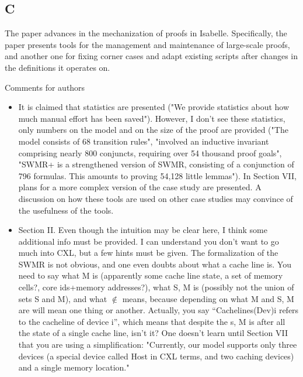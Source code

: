 \documentclass[10pt,conference]{IEEEtran}
\begin{document}
\subsection{C}
The paper advances in the mechanization of proofs in Isabelle. Specifically, the paper presents tools for the management and maintenance of large-scale proofs, and another one for fixing corner cases and adapt existing scripts after changes in the definitions it operates on.

Comments for authors
\begin{itemize}
    \item It is claimed that statistics are presented ("We provide statistics about how much manual effort has been saved"). However, I don't see these statistics, only numbers on the model and on the size of the proof are provided ("The model consists of 68 transition rules", "involved an inductive invariant comprising nearly 800 conjuncts, requiring over 54 thousand proof goals", "SWMR+ is a strengthened version of SWMR, consisting of a conjunction of 796 formulas. This amounts to proving 54,128 little lemmas"). In Section VII, plans for a more complex version of the case study are presented. A discussion on how these tools are used on other case studies may convince of the usefulness of the tools. 
    \item Section II. Even though the intuition may be clear here, I think some additional info must be provided. I can understand you don’t want to go much into CXL, but a few hints must be given. The formalization of the SWMR is not obvious, and one even doubts about what a cache line is. You need to say what M is (apparently some cache line state, a set of memory cells?, core ids+memory addresses?), what {S, M} is (possibly not the union of sets S and M), and what $\not\in$ means, because depending on what M and {S, M} are will mean one thing or another. Actually, you say “Cachelines(Dev)i refers to the cacheline of device i”, which means that despite the s, M is after all the state of a single cache line, isn’t it? One doesn't learn until Section VII that you are using a simplification: "Currently, our model supports only three devices (a special device called Host in CXL terms, and two caching devices) and a single memory location."

\end{itemize}
\end{document}
